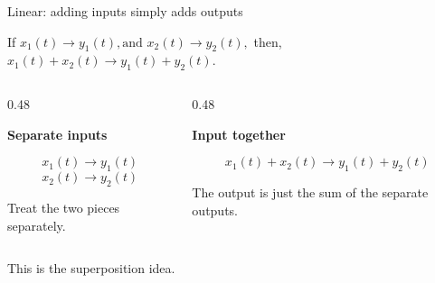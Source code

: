 \documentclass[aspectratio=169,11pt]{beamer}
\newcommand{\CardTitleSize}{\large}
\newcommand{\CardTitle}[1]{%
  \vspace{0.15cm}
  {\CardTitleSize\bfseries #1}\par
}
\begin{document}
\begin{frame}{Linear: adding inputs simply adds outputs}

\begin{OrangeBox}[
  calloutshadedorange,
  fontupper=\large,
  halign=center
]{}
If
\(
x_1(t)\longrightarrow y_1(t),
\text{and } 
x_2(t)\longrightarrow y_2(t),
\)
then, 
\(
x_1(t)+x_2(t)\longrightarrow y_1(t)+y_2(t).
\)
\end{OrangeBox}

\vspace{0.10cm}

\begin{columns}[c,totalwidth=\textwidth]

\begin{column}{0.48\textwidth}
\begin{BlueCard}[halign=center,top=12pt,bottom=12pt]
\CardTitle{Separate inputs}

\vspace{0.08cm}

{\Large
\[
x_1(t)\longrightarrow y_1(t)
\]
\[
x_2(t)\longrightarrow y_2(t)
\]
}

\vspace{0.08cm}

{\normalsize
Treat the two pieces separately.
}
\end{BlueCard}
\end{column}

\begin{column}{0.48\textwidth}
\begin{GreenCard}[halign=center,top=12pt,bottom=12pt]
\CardTitle{Input together}

\vspace{0.08cm}

{\Large
\[
x_1(t)+x_2(t)
\longrightarrow
y_1(t)+y_2(t)
\]
}

\vspace{0.08cm}

{\normalsize
The output is just the sum of the separate outputs.
}
\end{GreenCard}
\end{column}

\end{columns}

\vspace{0.12cm}

\begin{BlueBox}[calloutshadedblue,halign=center,fontupper=\large]{}
This is the superposition idea.
\end{BlueBox}

\end{frame}
\end{document}

